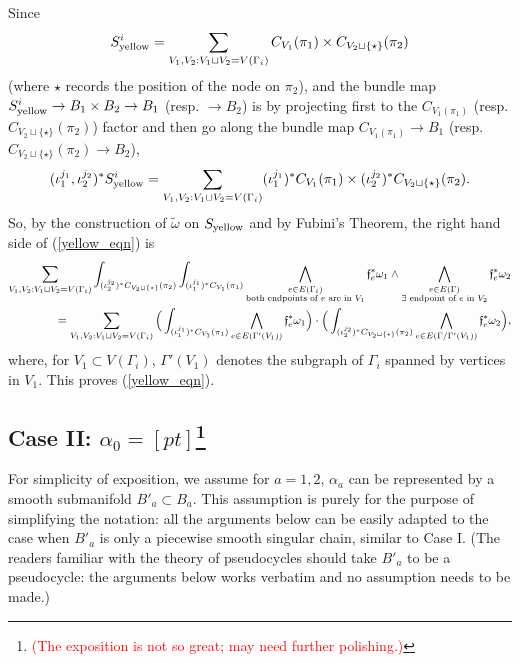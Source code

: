 \documentclass[11pt]{article}
\theoremstyle{definition}
\theoremstyle{remark}
\def\wt#1{\widetilde{#1}}
\def\syellow{{\textnormal{yellow}}}
\def\ff{\mathfrak{f}}
\def\cmt#1{\textcolor{red}{(#1)}}
\def\tn#1{\textnormal{#1}}
\begin{document}
Since
$$S_{\syellow}^i=
\sum_{V_1,V_2:V_1\sqcup V_2=V(\Gamma_i)}
{C}_{V_1}(\pi_1)\times{C}_{V_2\sqcup\{\star\}}(\pi_2)
$$
(where $\star$ records the position of the node on $\pi_2$), 
and the bundle map $S_{\syellow}^i\to B_1\times B_2\to B_1$  (resp. $\to B_2$) is by projecting first to the $C_{V_1(\pi_1)}$ (resp. $C_{V_2\sqcup\{\star\}}(\pi_2)$) factor and then go along the bundle map $C_{V_1(\pi_1)}\to B_1$ (resp. $C_{V_2\sqcup\{\star\}}(\pi_2)\to B_2$), 
$$(\iota_1^{j_1},\iota_2^{j_2})^*S_{\syellow}^i=\sum_{V_1,V_2:V_1\sqcup V_2=V(\Gamma_i)}(\iota_1^{j_1})^*C_{V_1}(\pi_1)\times(\iota_2^{j_2})^*C_{V_2\sqcup\{\star\}}(\pi_2).$$
So, by the construction of $\wt\omega$ on $S_{\syellow}$ and by Fubini's Theorem, the right hand side of (\ref{yellow_eqn}) is
\begin{align*}
\sum_{V_1,V_2:V_1\sqcup V_2=V(\Gamma_i)}
\int_{(\iota_2^{j_2})^*{C}_{V_2\sqcup\{\star\}}(\pi_2)}\int_{(\iota_1^{j_1})^*{C}_{V_1}(\pi_1)}
\bigwedge_{\begin{subarray}{c}e\in E(\Gamma_i)\\\tn{both endpoints of }e\tn{ are in }V_1\end{subarray}}\ff_e^*{\omega_1}\wedge
\bigwedge_{\begin{subarray}{c}e\in E(\Gamma)\\ \exists\tn{ endpoint of }e\tn{ in }V_2\end{subarray}}\ff_e^*{\omega_2}\\
=\sum_{V_1,V_2:V_1\sqcup V_2=V(\Gamma_i)}
\Big(\int_{(\iota_1^{j_1})^*{C}_{V_1}(\pi_1)}
\bigwedge_{e\in E(\Gamma'(V_1))} 
\ff_e^*{\omega_1}\Big)
\cdot
\Big(\int_{(\iota_2^{j_2})^*{C}_{V_2\sqcup\{\star\}}(\pi_2)}
\bigwedge_{e\in E(\Gamma/\Gamma'(V_1))}
\ff_e^*{\omega_2}\Big), 
\end{align*}
where, for $V_1\subset V(\Gamma_i)$, $\Gamma'(V_1)$ denotes the subgraph of $\Gamma_i$ spanned by vertices in $V_1$. 
This proves (\ref{yellow_eqn}). 

\subsection*{Case II: $\alpha_0=[pt]$\footnote{\cmt{The exposition is not so great; may need further polishing.}}}

For simplicity of exposition, we assume for $a=1,2$, $\alpha_a$ can be represented by a smooth submanifold $B'_a\subset B_a$. 
This assumption is purely for the purpose of simplifying the notation: all the arguments below can be easily adapted to the case when $B'_a$ is only a piecewise smooth singular chain, similar to Case I. 
(The readers familiar with the theory of pseudocycles should take $B'_a$ to be a pseudocycle: the arguments below works verbatim and no assumption needs to be made.)
\end{document}
